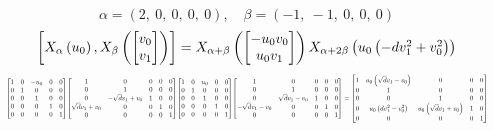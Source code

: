 \documentclass[11pt]{article}
\theoremstyle{definition}
\begin{document}
\[
\alpha = \left( 2, \  0, \  0, \  0, \  0\right), \quad \beta = \left( -1, \  -1, \  0, \  0, \  0\right)
\]
\[
\scaletoalign{\textwidth}{\left[ X_{\alpha}\left(u_{0}\right), X_{\beta}\left(\left[\begin{matrix}v_{0}\\v_{1}\end{matrix}\right]\right) \right] = X_{\alpha + \beta}\left(\left[\begin{matrix}- u_{0} v_{0}\\u_{0} v_{1}\end{matrix}\right]\right) X_{\alpha + 2\beta}\left(u_{0} \left(- d v_{1}^{2} + v_{0}^{2}\right)\right)}
\]
\[
\scaletoalign{\textwidth}{{\left[\begin{matrix}1 & 0 & - u_{0} & 0 & 0\\0 & 1 & 0 & 0 & 0\\0 & 0 & 1 & 0 & 0\\0 & 0 & 0 & 1 & 0\\0 & 0 & 0 & 0 & 1\end{matrix}\right]} {\left[\begin{matrix}1 & 0 & 0 & 0 & 0\\0 & 1 & 0 & 0 & 0\\0 & - \sqrt{d} v_{1} + v_{0} & 1 & 0 & 0\\\sqrt{d} v_{1} + v_{0} & 0 & 0 & 1 & 0\\0 & 0 & 0 & 0 & 1\end{matrix}\right]} {\left[\begin{matrix}1 & 0 & u_{0} & 0 & 0\\0 & 1 & 0 & 0 & 0\\0 & 0 & 1 & 0 & 0\\0 & 0 & 0 & 1 & 0\\0 & 0 & 0 & 0 & 1\end{matrix}\right]} {\left[\begin{matrix}1 & 0 & 0 & 0 & 0\\0 & 1 & 0 & 0 & 0\\0 & \sqrt{d} v_{1} - v_{0} & 1 & 0 & 0\\- \sqrt{d} v_{1} - v_{0} & 0 & 0 & 1 & 0\\0 & 0 & 0 & 0 & 1\end{matrix}\right]} = {\left[\begin{matrix}1 & u_{0} \left(\sqrt{d} v_{1} - v_{0}\right) & 0 & 0 & 0\\0 & 1 & 0 & 0 & 0\\0 & 0 & 1 & 0 & 0\\0 & u_{0} \left(d v_{1}^{2} - v_{0}^{2}\right) & u_{0} \left(\sqrt{d} v_{1} + v_{0}\right) & 1 & 0\\0 & 0 & 0 & 0 & 1\end{matrix}\right]}}
\]
\end{document}
